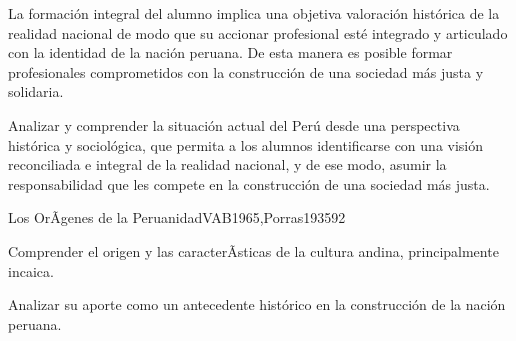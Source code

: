 \begin{syllabus}


\begin{justification}
La formación integral del alumno implica una objetiva valoración histórica de la 
realidad nacional de modo que su accionar profesional esté integrado y articulado 
con la identidad de la nación peruana. De esta manera es posible formar profesionales 
comprometidos con la construcción de una sociedad más justa y solidaria.
\end{justification}

\begin{goals}
\item Analizar y comprender la situación actual del Perú desde una perspectiva 
histórica y sociológica, que permita a los alumnos identificarse con una visión 
reconciliada e integral de la realidad nacional, y de ese modo, asumir la 
responsabilidad que les compete en la construcción de una sociedad más justa.
\end{goals}

\begin{outcomes}
\end{outcomes}

\begin{unit}{Los OrÃ­genes de la Peruanidad}{VAB1965,Porras1935}{9}{2}
\begin{topics}
      \item 
\end{topics}
\begin{unitgoals}
      \item Comprender el origen y las caracterÃ­sticas de la cultura andina, principalmente incaica.
      \item Analizar su aporte como un antecedente histórico en la construcción de la nación peruana.
\end{unitgoals}
\end{unit}


\end{syllabus}
